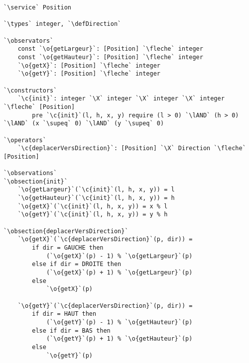 \documentclass{article}
\newcommand{\fleche}{$\rightarrow{}$}
\newcommand{\X}{$\times{}$}
\newcommand{\supeq}{$\geq$~}
\newcommand{\lAND}{$\land$}
\newcommand{\specsec}[1]{\normalfont{\large{\textbf{#1:}}}}
\newcommand{\service}{\specsec {Service}}
\newcommand{\types}{\specsec {Types}}
\newcommand{\observators}{\specsec {Observators}}
\newcommand{\constructors}{\specsec {Constructors}}
\newcommand{\operators}{\specsec {Operators}}
\newcommand{\observations}{\specsec {Observations}}
\newcommand{\obsection}[1]{\textbf{[#1]}}
\newcommand{\Direction}{Direction}
\newcommand{\defDirection}{\mbox{enum \Direction}~\{~HAUT, BAS, GAUCHE, DROITE~\}}
\renewcommand{\o}[1]{\textcolor{blue}{#1}}
\renewcommand{\c}[1]{\textcolor{red}{#1}}
\begin{document}
\begin{lstlisting}[caption=Position]
`\service` Position

`\types` integer, `\defDirection`

`\observators`
	const `\o{getLargeur}`: [Position] `\fleche` integer
	const `\o{getHauteur}`: [Position] `\fleche` integer
	`\o{getX}`: [Position] `\fleche` integer
	`\o{getY}`: [Position] `\fleche` integer
	
`\constructors`
	`\c{init}`: integer `\X` integer `\X` integer `\X` integer `\fleche` [Position]
		pre `\c{init}`(l, h, x, y) require (l > 0) `\lAND` (h > 0) `\lAND` (x `\supeq` 0) `\lAND` (y `\supeq` 0)

`\operators`
	`\c{deplacerVersDirection}`: [Position] `\X` Direction `\fleche` [Position]
	
`\observations`
`\obsection{init}`
	`\o{getLargeur}`(`\c{init}`(l, h, x, y)) = l
	`\o{getHauteur}`(`\c{init}`(l, h, x, y)) = h
	`\o{getX}`(`\c{init}`(l, h, x, y)) = x % l
	`\o{getY}`(`\c{init}`(l, h, x, y)) = y % h

`\obsection{deplacerVersDirection}`
	`\o{getX}`(`\c{deplacerVersDirection}`(p, dir)) =
		if dir = GAUCHE then
			(`\o{getX}`(p) - 1) % `\o{getLargeur}`(p)
		else if dir = DROITE then
			(`\o{getX}`(p) + 1) % `\o{getLargeur}`(p)
		else
			`\o{getX}`(p)
			
	`\o{getY}`(`\c{deplacerVersDirection}`(p, dir)) =
		if dir = HAUT then
			(`\o{getY}`(p) - 1) % `\o{getHauteur}`(p)
		else if dir = BAS then
			(`\o{getY}`(p) + 1) % `\o{getHauteur}`(p)
		else
			`\o{getY}`(p)
\end{lstlisting}

\clearpage{}
\end{document}
